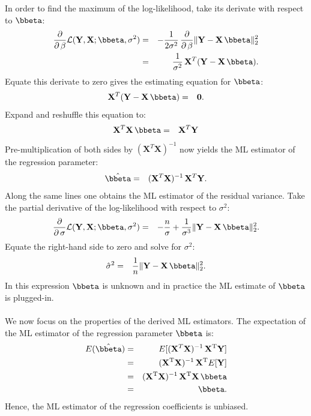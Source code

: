 \documentclass[a4paper]{article}
\theoremstyle{myexamplestyle}
\begin{document}
In order to find the maximum of the log-likelihood, take its derivate with respect to $\bbeta$:
\begin{eqnarray*}
\frac{\partial }{\partial \, \beta} \mathcal{L}(\mathbf{Y}, \mathbf{X}; \bbeta, \sigma^2) & = & -  \frac{1}{ 2 \sigma^2} \, \frac{\partial }{\partial \, \beta} \| \mathbf{Y} - \mathbf{X} \, \bbeta \|^2_2
\\
& = & \frac{1}{\sigma^2} \, \mathbf{X}^T (\mathbf{Y} - \mathbf{X} \, \bbeta).
\end{eqnarray*}
Equate this derivate to zero gives the estimating equation for $\bbeta$:
\begin{eqnarray*}
\mathbf{X}^T (\mathbf{Y} - \mathbf{X} \, \bbeta) & = &  \mathbf{0}.
\end{eqnarray*}
Expand and reshuffle this equation to:
\begin{eqnarray*}
\mathbf{X}^T \mathbf{X} \, \bbeta & = &  \mathbf{X}^T \mathbf{Y}
\end{eqnarray*}
Pre-multiplication of both sides by $(\mathbf{X}^T \mathbf{X})^{-1}$ now yields the ML estimator of the regression parameter:
\begin{eqnarray*}
\hat{\bbeta} & = &  (\mathbf{X}^T \mathbf{X})^{-1} \, \mathbf{X}^T \mathbf{Y}.
\end{eqnarray*}
Along the same lines one obtains the ML estimator of the residual variance. Take the partial derivative of the log-likelihood with respect to $\sigma^2$:
\begin{eqnarray*}
\frac{\partial }{\partial \, \sigma} \mathcal{L}(\mathbf{Y}, \mathbf{X}; \bbeta, \sigma^2) & = & -  \frac{n}{\sigma}  +  \frac{1}{\sigma^3} \| \mathbf{Y} - \mathbf{X} \, \bbeta \|^2_2.
\end{eqnarray*}
Equate the right-hand side to zero and solve for $\sigma^2$:
\begin{eqnarray*}
\hat{\sigma}^2  & = &  \frac{1}{n} \| \mathbf{Y} - \mathbf{X} \, \bbeta \|^2_2.
\end{eqnarray*}
In this expression $\bbeta$ is unknown and in practice the ML estimate of $\bbeta$ is plugged-in.
\\
\\
We now focus on the properties of the derived ML estimators. The expectation of the ML estimator of the regression parameter $\bbeta$ is:
\begin{eqnarray*}
E(\hat{\bbeta}) & = &  E[ (\mathbf{X}^T \mathbf{X})^{-1} \, \mathbf{X}^{\mathrm{T}} \mathbf{Y}]
\\
& = & (\mathbf{X}^{\mathrm{T}} \mathbf{X})^{-1} \, \mathbf{X}^{\mathrm{T}} E[ \mathbf{Y}]
\\
& = & (\mathbf{X}^{\mathrm{T}} \mathbf{X})^{-1} \, \mathbf{X}^{\mathrm{T}} \mathbf{X} \, \bbeta
\\
& = & \bbeta.
\end{eqnarray*}
Hence, the ML estimator of the regression coefficients is unbiased.
\end{document}
